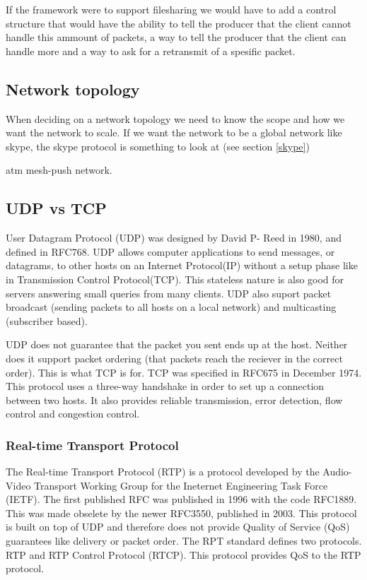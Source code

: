 If the framework were to support filesharing we would have to add a control structure that would have the ability to tell the producer that the client cannot handle this ammount of packets, a way to tell the producer that the client can handle more and a way to ask for a retransmit of a spesific packet.

\subsection{Network topology}
When deciding on a network topology we need to know the scope and how we want the network to scale. If we want the network to be a global network like skype, the skype protocol is something to look at (see section \ref{skype})

atm mesh-push network.

\subsection{UDP vs TCP}
User Datagram Protocol (UDP) was designed by David P- Reed in 1980, and defined in RFC768. UDP allows computer applications to send messages, or datagrams, to other hosts on an Internet Protocol(IP) without a setup phase like in Transmission Control Protocol(TCP). This stateless nature is also good for servers answering small queries from many clients. UDP also suport packet broadcast (sending packets to all hosts on a local network) and multicasting (subscriber based).

UDP does not guarantee that the packet you sent ends up at the host. Neither does it support packet ordering (that packets reach the reciever in the correct order). This is what TCP is for. TCP was specified in RFC675 in December 1974. This protocol uses a three-way handshake in order to set up a connection between two hosts. It also provides reliable transmission, error detection, flow control and congestion control. 

\subsubsection{Real-time Transport Protocol}
The Real-time Transport Protocol (RTP) is a protocol developed by the Audio-Video Transport Working Group for the Ineternet Engineering Task Force (IETF). The first published RFC was published in 1996 with the code RFC1889. This was made obselete by the newer RFC3550, published in 2003\cite{RFC3550}. This protocol is built on top of UDP and therefore does not provide Quality of Service (QoS) guarantees like delivery or packet order. The RPT standard defines two protocols. RTP and RTP Control Protocol (RTCP). This protocol provides QoS to the RTP protocol.

